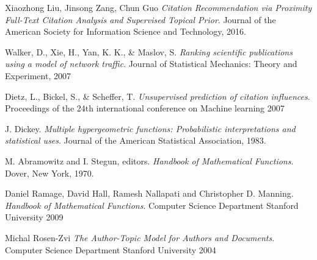 \documentclass[12pt,a4paper]{article}
\begin{document}
\newpage

\begin{thebibliography}{9}
Xiaozhong Liu, Jinsong Zang, Chun Guo
\textit{Citation Recommendation via Proximity Full-Text Citation Analysis and Supervised Topical Prior}. 
Journal of the American Society for Information Science and Technology, 2016.


Walker, D., Xie, H., Yan, K. K., \& Maslov, S. 
\textit{Ranking scientific publications using a model of network
traffic}.  
Journal of Statistical Mechanics: Theory and Experiment, 2007


Dietz, L., Bickel, S., \& Scheffer, T. 
\textit{ Unsupervised prediction of citation influences}.  
Proceedings of the
24th international conference on Machine learning 2007

 
 
J. Dickey.
\textit{ Multiple hypergeometric functions: Probabilistic interpretations and statistical uses}.  
Journal of the American Statistical Association, 1983.



M. Abramowitz and I. Stegun, editors.
\textit{ Handbook of Mathematical Functions}.  
Dover, New York, 1970.


Daniel Ramage, David Hall, Ramesh Nallapati and Christopher D. Manning.
\textit{ Handbook of Mathematical Functions}.  
Computer Science Department
Stanford University 2009


Michal Rosen-Zvi
\textit{The Author-Topic Model for Authors and Documents}.  
Computer Science Department
Stanford University 2004

\end{thebibliography}
\end{document}
